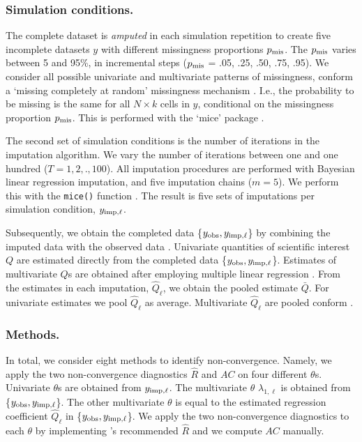 \documentclass[Royal,times,sageh]{sagej}
\begin{document}
\hypertarget{simulation-conditions.}{%
\subsubsection{Simulation conditions.}\label{simulation-conditions.}}

The complete dataset is \emph{amputed} in each simulation repetition to create five incomplete datasets \(y\) with different missingness proportions \(p_{\rm mis}\). The \(p_{\rm mis}\) varies between 5 and 95\%, in incremental steps (\(p_{\rm mis}\) = .05, .25, .50, .75, .95). We consider all possible univariate and multivariate patterns of missingness, conform a `missing completely at random' missingness mechanism \citep{rubin87}. I.e., the probability to be missing is the same for all \(N \times k\) cells in \(y\), conditional on the missingness proportion \(p_{\rm mis}\). This is performed with the `mice' package \citep[function \texttt{mice::ampute()};][]{mice}.

The second set of simulation conditions is the number of iterations in the imputation algorithm. We vary the number of iterations between one and one hundred (\(T = 1,2,.,100\)). All imputation procedures are performed with Bayesian linear regression imputation, and five imputation chains (\(m=5\)). We perform this with the \texttt{mice()} function \citep{mice}. The result is five sets of imputations per simulation condition, \(y_{\rm imp, \ell}\).

Subsequently, we obtain the completed data \{\(y_{\rm obs}, y_{\rm imp, \ell}\)\} by combining the imputed data with the observed data \citep[function \texttt{mice::complete()};][]{mice}. Univariate quantities of scientific interest \(Q\) are estimated directly from the completed data \{\(y_{\rm obs}, y_{\rm imp, \ell}\)\}. Estimates of multivariate \(Q\)s are obtained after employing multiple linear regression \citep[function \texttt{stats::lm()},][]{R}. From the estimates in each imputation, \(\hat{Q}_\ell\), we obtain the pooled estimate \(\bar{Q}\). For univariate estimates we pool \(\hat{Q}_\ell\) as average. Multivariate \(\hat{Q}_\ell\) are pooled conform \citet{vink14}.

\hypertarget{methods.}{%
\subsubsection{Methods.}\label{methods.}}

In total, we consider eight methods to identify non-convergence. Namely, we apply the two non-convergence diagnostics \(\widehat{R}\) and \(AC\) on four different \(\theta\)s. Univariate \(\theta\)s are obtained from \(y_{\rm imp, \ell}\). The multivariate \(\theta\) \(\lambda_{1,\ell}\) is obtained from \{\(y_{\rm obs}, y_{\rm imp, \ell}\)\}. The other multivariate \(\theta\) is equal to the estimated regression coefficient \(\hat{Q}_\ell\) in \{\(y_{\rm obs}, y_{\rm imp, \ell}\)\}. We apply the two non-convergence diagnostics to each \(\theta\) by implementing \citet{veht19} 's recommended \(\widehat{R}\) and we compute \(AC\) manually.
\end{document}
